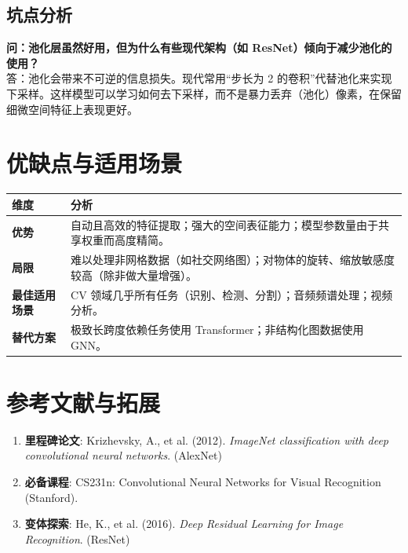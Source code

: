 \documentclass[12pt, a4paper]{article}
\begin{document}
\subsection{坑点分析}
\textbf{问：池化层虽然好用，但为什么有些现代架构（如 ResNet）倾向于减少池化的使用？}\\
答：池化会带来不可逆的信息损失。现代常用“步长为 2 的卷积”代替池化来实现下采样。这样模型可以学习如何去下采样，而不是暴力丢弃（池化）像素，在保留细微空间特征上表现更好。

\section{优缺点与适用场景}

\begin{table}[h]
\centering
\begin{tabularx}{\textwidth}{|l|X|}
\hline
\textbf{维度} & \textbf{分析} \\
\hline
\textbf{优势} & 自动且高效的特征提取；强大的空间表征能力；模型参数量由于共享权重而高度精简。 \\
\hline
\textbf{局限} & 难以处理非网格数据（如社交网络图）；对物体的旋转、缩放敏感度较高（除非做大量增强）。 \\
\hline
\textbf{最佳适用场景} & CV 领域几乎所有任务（识别、检测、分割）；音频频谱处理；视频分析。 \\
\hline
\textbf{替代方案} & 极致长跨度依赖任务使用 Transformer；非结构化图数据使用 GNN。 \\
\hline
\end{tabularx}
\end{table}

\section{参考文献与拓展}
\begin{enumerate}
    \item \textbf{里程碑论文}: Krizhevsky, A., et al. (2012). \textit{ImageNet classification with deep convolutional neural networks}. (AlexNet)
    \item \textbf{必备课程}: CS231n: Convolutional Neural Networks for Visual Recognition (Stanford).
    \item \textbf{变体探索}: He, K., et al. (2016). \textit{Deep Residual Learning for Image Recognition}. (ResNet)
\end{enumerate}
\end{document}

